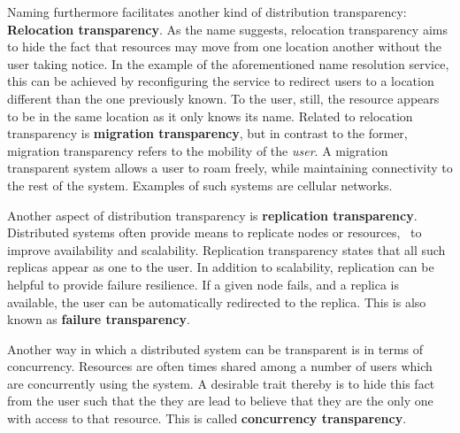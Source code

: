Naming furthermore facilitates another kind of distribution transparency: \textbf{Relocation transparency}. As the name suggests, relocation transparency aims to hide the fact that resources may move from one location another without the user taking notice. In the example of the aforementioned name resolution service, this can be achieved by reconfiguring the service to redirect users to a location different than the one previously known. To the user, still, the resource appears to be in the same location as it only knows its name.
Related to relocation transparency is \textbf{migration transparency}, but in contrast to the former, migration transparency refers to the mobility of the \emph{user}. A migration transparent system allows a user to roam freely, while maintaining connectivity to the rest of the system. Examples of such systems are cellular networks.

Another aspect of distribution transparency is \textbf{replication transparency}. Distributed systems often provide means to replicate nodes or resources, \eg\ to improve availability and scalability. Replication transparency states that all such replicas appear as one to the user. In addition to scalability, replication can be helpful to provide failure resilience. If a given node fails, and a replica is available, the user can be automatically redirected to the replica. This is also known as \textbf{failure transparency}.

Another way in which a distributed system can be transparent is in terms of concurrency. Resources are often times shared among a number of users which are concurrently using the system. A desirable trait thereby is to hide this fact from the user such that the they are lead to believe that they are the only one with access to that resource. This is called \textbf{concurrency transparency}.


%
%
%
%
%
%
%
%
%
%

